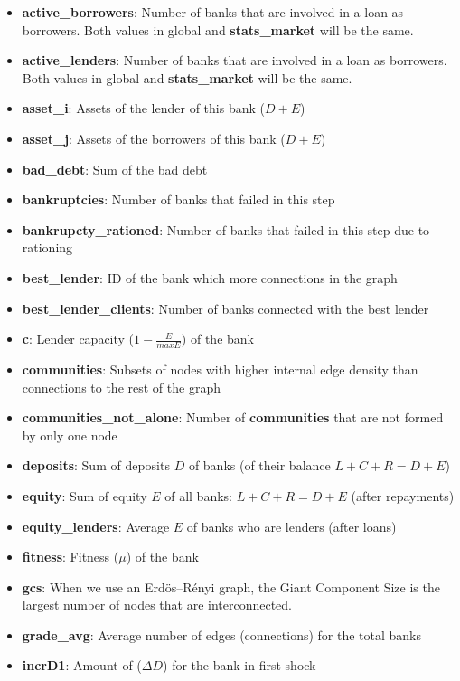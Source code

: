 \documentclass{article}
\begin{document}
\begin{itemize}
    \item \textbf{active\_borrowers}: Number of banks that are involved in a loan as borrowers. Both values in global and \textbf{stats\_market} will be the same.
    \item \textbf{active\_lenders}: Number of banks that are involved in a loan as borrowers. Both values in global and \textbf{stats\_market} will be the same.
    \item \textbf{asset\_i}: Assets of the lender of this bank ($D + E$)
    \item \textbf{asset\_j}: Assets of the borrowers of this bank ($D + E$)
    \item \textbf{bad\_debt}: Sum of the bad debt
    \item \textbf{bankruptcies}: Number of banks that failed in this step
    \item \textbf{bankrupcty\_rationed}: Number of banks that failed in this step due to rationing
    \item \textbf{best\_lender}: ID of the bank which more connections in the graph
    \item \textbf{best\_lender\_clients}: Number of banks connected with the best lender
    \item \textbf{c}: Lender capacity ($1 - \frac{E}{maxE}$) of the bank
    \item \textbf{communities}: Subsets of nodes with higher internal edge density than connections to the rest of the graph
    \item \textbf{communities\_not\_alone}:  Number of \textbf{communities} that are not formed by only one node
    \item \textbf{deposits}: Sum of deposits $D$ of banks (of their balance $L + C + R = D + E$)
    \item \textbf{equity}: Sum of equity $E$ of all banks: $L + C + R = D + E$ (after repayments)
    \item \textbf{equity\_lenders}: Average $E$ of banks who are lenders (after loans)
    \item \textbf{fitness}: Fitness ($\mu$) of the bank
    \item \textbf{gcs}: When we use an Erdös–Rényi graph, the Giant Component Size is the largest number of nodes that are interconnected.
    \item \textbf{grade\_avg}: Average number of edges (connections) for the total banks
    \item \textbf{incrD1}: Amount of ($ \Delta D$) for the bank in first shock

\end{itemize}
\end{document}
